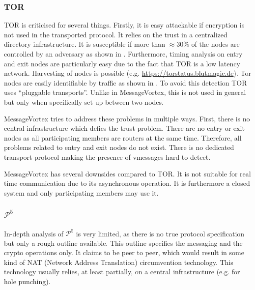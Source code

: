 \documentclass[9pt,journal,compsoc]{IEEEtran}
\begin{document}
\subsubsection{TOR}
%
TOR is criticised for several things. Firstly, it is easy attackable if encryption is not used in the transported protocol. It relies on the trust in a centralized directory infrastructure. It is susceptible if more than $\approx 30\%$ of the nodes are controlled by an adversary as shown in \cite{jansen2014sniper}. Furthermore, timing analysis on entry and exit nodes are particularly easy due to the fact that TOR is a low latency network\cite{torta05,esorics10-bandwidth}. Harvesting of nodes is possible (e.g. \url{https://torstatus.blutmagie.de}). Tor nodes are easily identifiable by traffic as shown in \cite{foci12-winter}. To avoid this detection TOR uses ``pluggable transports''. Unlike in MessageVortex, this is not used in general but only when specifically set up between two nodes.

MessageVortex tries to address these problems in multiple ways. First, there is no central infrastructure which defies the trust problem. There are no entry or exit nodes as all participating members are routers at the same time. Therefore, all problems related to entry and exit nodes do not exist. There is no dedicated transport protocol making the presence of vmessages hard to detect.

MessageVortex has several downsides compared to TOR. It is not suitable for real time communication due to its asynchronous operation. It is furthermore a closed system and only participating members may use it. %

\subsubsection{$\mathcal{P}^5$}
%
In-depth analysis of $\mathcal{P}^5$ is very limited, as there is no true protocol specification but only a rough outline available. This outline specifies the messaging and the crypto operations only. It claims to be peer to peer, which would result in some kind of NAT (Network Address Translation) circumvention technology. This technology usually relies, at least partially, on a central infrastructure (e.g. for hole punching). 
\end{document}
